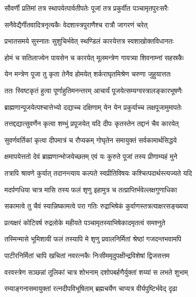 \twolineshloka
{सौवर्णी प्रतिमां तत्र स्थापयेत्पार्वतीपतेः}
{पूजां तत्र प्रकुर्वीत पञ्चामृतपुरःसरैः} %

\twolineshloka
{सनैवेद्यैर्गीतवादित्रनृत्यकैः}
{वेदशास्त्रपुराणैश्च रात्रौ जागरणं चरेत्} %

\twolineshloka
{प्रभातसमये सुस्नातः सुशुचिर्भवेत्}
{स्थण्डिलं कारयेत्तत्र स्वशाखोक्तविधानतः} %

\twolineshloka
{होमं च सतिलाज्येन पायसेन च कारयेत्}
{मूलमन्त्रेण गायत्र्या शिवनाम्नां सहस्रकैः} %

\twolineshloka
{येन मन्त्रेण पूजा तु कृता तेनैव होमयेत्}
{शर्कराघृतमिश्रेण चरुणा जुहुयात्ततः} %

\twolineshloka
{ततः स्विष्टकृतं हुत्वा पूर्णाहुतिमनन्तरम्}
{आचार्यं पूजयेत्सम्यग्वस्त्रालङ्कारभूषणैः} %

\twolineshloka
{ब्राह्मणान्पूजयेत्पश्चात्तेभ्यो दद्याच्च दक्षिणाम्}
{येन येन प्रकुर्याच्च लक्षपूजामुमापतेः} %

\twolineshloka
{तत्तद्दद्यात्सुवर्णेन कृत्वा शम्भुं प्रपूजयेत्}
{यदि दीपः कृतस्तेन तद्दानं चैव कारयेत्} %

\twolineshloka
{सुवर्णवर्तिकां कृत्वा दीपमात्रं च रौप्यकम्}
{गोघृतेन समायुक्तं सर्वकामार्थसिद्धये} %

\twolineshloka
{क्षमापयेत्ततो देवं ब्राह्मणान्भोजयेच्छतम्}
{एवं यः कुरुते पूजां तस्य प्रीणाम्यहं मुने} %

\twolineshloka
{तत्रापि श्रावणे कुर्यात् तदानन्त्याय कल्पते}
{स्वप्रीतिविषयः कश्चित्पदार्थस्त्यज्यते यदि} %

\twolineshloka
{मदर्पणधिया चात्र मासि तस्य फलं शृणु}
{इहामुत्र च तत्प्राप्तिर्भवेल्लक्षगुणाधिका} %

\twolineshloka
{सकामत्वे तु चैवं स्यान्निष्कामत्वे परा गतिः}
{रुद्राभिषेकं कुर्वाणस्तत्रत्याक्षरसङ्ख्यया} %

\twolineshloka
{प्रत्यक्षरं कोटिवर्ष रुद्रलोके महीयते}
{पञ्चामृतस्याभिषेकादमृतत्वं समश्नुते} %

\twolineshloka
{तस्मिन्मासे भूमिशायी फलं तस्यापि मे शृणु}
{प्रवालनिर्मितां श्रेष्ठां गजदन्तभवामपि} %

\twolineshloka
{पाटीरनिर्मितां चापि खचितां नवरत्नकैः}
{निःसीममृदुपक्षीन्द्रविशेषां द्विजसत्तम} %

\twolineshloka
{वरवस्त्रेण सञ्छन्नां तूलिकां चात्र शोभनाम्}
{दशोपबर्हणैर्युक्तां शय्यां स लभते शुभाम्} %

\twolineshloka
{रम्याङ्गनासमायुक्तां रत्नदीपविभूषिताम्}
{ब्रह्मचर्येण चाप्यत्र वीर्यपुष्टिर्भवेद् दृढा} %

